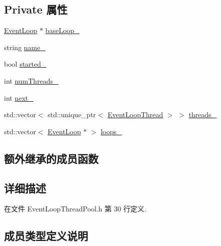 \subsection*{Private 属性}
\begin{DoxyCompactItemize}
\item 
\hyperlink{classmuduo_1_1net_1_1EventLoop}{Event\+Loop} $\ast$ \hyperlink{classmuduo_1_1net_1_1EventLoopThreadPool_abd40a665f0987cb18463ec326b966b06}{base\+Loop\+\_\+}
\item 
string \hyperlink{classmuduo_1_1net_1_1EventLoopThreadPool_a79cfd788b219a7f48068d0e96e5e8e77}{name\+\_\+}
\item 
bool \hyperlink{classmuduo_1_1net_1_1EventLoopThreadPool_a5ad69cfc4163d7797bc0f0d7eadb95a7}{started\+\_\+}
\item 
int \hyperlink{classmuduo_1_1net_1_1EventLoopThreadPool_ace47a99e5a5a2f2f0cd96ab6108d432b}{num\+Threads\+\_\+}
\item 
int \hyperlink{classmuduo_1_1net_1_1EventLoopThreadPool_aca74906911b1be75766735048142edae}{next\+\_\+}
\item 
std\+::vector$<$ std\+::unique\+\_\+ptr$<$ \hyperlink{classmuduo_1_1net_1_1EventLoopThread}{Event\+Loop\+Thread} $>$ $>$ \hyperlink{classmuduo_1_1net_1_1EventLoopThreadPool_ac9f6b1fc15d40cc0a17bcb5422cd6c4d}{threads\+\_\+}
\item 
std\+::vector$<$ \hyperlink{classmuduo_1_1net_1_1EventLoop}{Event\+Loop} $\ast$ $>$ \hyperlink{classmuduo_1_1net_1_1EventLoopThreadPool_a07ba07ac88b81aabf4b59f19f6494c3f}{loops\+\_\+}
\end{DoxyCompactItemize}
\subsection*{额外继承的成员函数}


\subsection{详细描述}


在文件 Event\+Loop\+Thread\+Pool.\+h 第 30 行定义.



\subsection{成员类型定义说明}
\mbox{\label{classmuduo_1_1net_1_1EventLoopThreadPool_a4665880f4633f1e7d95fd6fef6811717}} 
